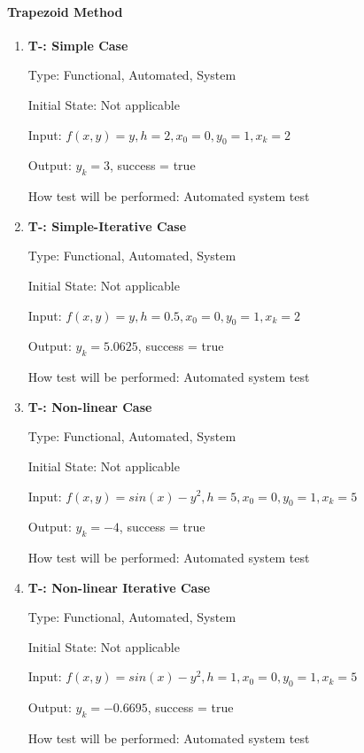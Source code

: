\documentclass[12pt, titlepage]{article}
\newcounter{tnum} %
\begin{document}
\paragraph{Trapezoid Method}
\begin{enumerate}

\item{\textbf{T-\thetnum \label{t-trap_simple}: Simple Case}}

Type: Functional, Automated, System %
					
Initial State: Not applicable
					
Input: $f(x, y) = y, h = 2, x_0 = 0, y_0 = 1, x_k = 2$
					
Output: $y_k = 3$, success = true
					
How test will be performed: Automated system test

\item{\textbf{T-\thetnum \label{t-trap_simpleiterative}: Simple-Iterative Case}}

Type: Functional, Automated, System %
					
Initial State: Not applicable
					
Input: $f(x, y) = y, h = 0.5, x_0 = 0, y_0 = 1, x_k = 2$
					
Output: $y_k = 5.0625$, success = true
					
How test will be performed: Automated system test

\item{\textbf{T-\thetnum \label{t-trap_nonlinear}: Non-linear Case}}

Type: Functional, Automated, System %
					
Initial State: Not applicable
					
Input: $f(x, y) = sin(x) - y^2, h = 5, x_0 = 0, y_0 = 1, x_k = 5$
					
Output: $y_k = -4$, success = true
					
How test will be performed: Automated system test

\item{\textbf{T-\thetnum \label{t-trap_nonlineariterative}: Non-linear Iterative Case}}

Type: Functional, Automated, System %
					
Initial State: Not applicable
					
Input: $f(x, y) = sin(x) - y^2, h = 1, x_0 = 0, y_0 = 1, x_k = 5$
					
Output: $y_k = -0.6695$, success = true
					
How test will be performed: Automated system test

\end{enumerate}
\end{document}
